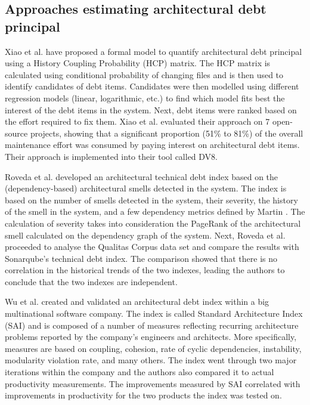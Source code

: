 \subsection{Approaches estimating architectural debt principal}\label{c6:sec:related-work-atd}
Xiao et al. \cite{Xiao2016} have proposed a formal model to quantify architectural debt principal using a History Coupling Probability (HCP) matrix.
The HCP matrix is calculated using conditional probability of changing files and is then used to identify candidates of debt items.
Candidates were then modelled using different regression models (linear, logarithmic, etc.) to find which model fits best the interest of the debt items in the system.
Next, debt items were ranked based on the effort required to fix them.
Xiao et al. evaluated their approach on 7 open-source projects, showing that a significant proportion (51\% to 81\%) of the overall maintenance effort was consumed by paying interest on architectural debt items.
Their approach is implemented into their tool called DV8.

Roveda et al. \cite{Roveda2018} developed an architectural technical debt index based on the (dependency-based) architectural smells detected in the system.
The index is based on the number of smells detected in the system, their severity, the history of the smell in the system, and a few dependency metrics defined by Martin \cite{Martin2018}.
The calculation of severity takes into consideration the PageRank of the architectural smell calculated on the dependency graph of the system.
Next, Roveda et al. proceeded to analyse the Qualitas Corpus data set \cite{Terra2013,Tempero2010} and compare the results with Sonarqube's technical debt index.
The comparison showed that there is no correlation in the historical trends of the two indexes, leading the authors to conclude that the two indexes are independent.

Wu et al. \cite{Wu2018} created and validated an architectural debt index within a big multinational software company.
The index is called Standard Architecture Index (SAI) and is composed of a number of measures reflecting recurring architecture problems reported by the company's engineers and architects.
More specifically, measures are based on coupling, cohesion, rate of cyclic dependencies, instability, modularity violation rate, and many others.
The index went through two major iterations within the company and the authors also compared it to actual productivity measurements.
The improvements measured by SAI correlated with improvements in productivity for the two products the index was tested on.

